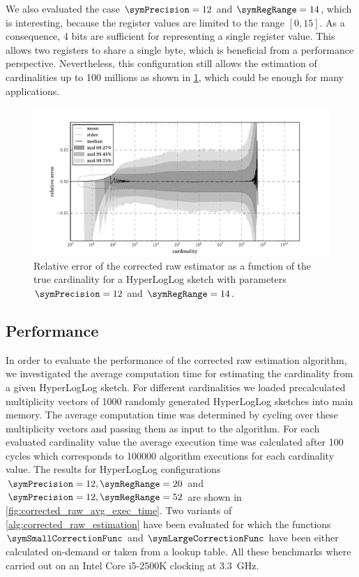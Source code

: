 \documentclass[a4paper]{scrartcl}
\begin{document}
We also evaluated the case $\symPrecision = 12$ and $\symRegRange=14$, which is interesting, because the register values are limited to the range $[0, 15]$. As a consequence, 4 bits are sufficient for representing a single register value. This allows two registers to share a single byte, which is beneficial from a performance perspective. Nevertheless, this configuration still allows the estimation of cardinalities up to 100 millions as shown in \cref{fig:raw_corrected_estimation_error_12_14}, which could be enough for many applications.

\begin{figure}
\centering
\includegraphics[width=1\textwidth]{raw_corrected_estimate_12_14}
\caption{Relative error of the corrected raw estimator as a function of the true cardinality for a HyperLogLog sketch with parameters $\symPrecision = 12$ and $\symRegRange=14$.}
\label{fig:raw_corrected_estimation_error_12_14}
\end{figure}

\subsection{Performance}
\label{sec:corrected_raw_estimation_algorithm}
In order to evaluate the performance of the corrected raw estimation algorithm, we investigated the average computation time for estimating the cardinality from a given HyperLogLog sketch. For different cardinalities we loaded precalculated multiplicity vectors of \num{1000} randomly generated HyperLogLog sketches into main memory. The average computation time was determined by cycling over these multiplicity vectors and passing them as input to the algorithm. For each evaluated cardinality value the average execution time was calculated after 100 cycles which corresponds to \num{100000} algorithm executions for each cardinality value. The results for HyperLogLog configurations $\symPrecision=12, \symRegRange=20$ and $\symPrecision=12, \symRegRange=52$ are shown in \cref{fig:corrected_raw_avg_exec_time}. Two variants of \cref{alg:corrected_raw_estimation} have been evaluated for which the functions $\symSmallCorrectionFunc$ and $\symLargeCorrectionFunc$ have been either calculated on-demand or taken from a lookup table. All these benchmarks where carried out on an Intel Core i5-2500K clocking at \SI{3.3}{\giga\hertz}. 
\end{document}
